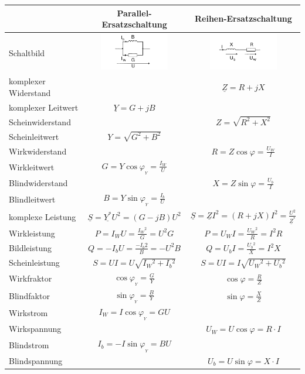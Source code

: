 	\begin{centering}
			
	\begin{tabular}{|l|c|c|}
		\hline
			& Parallel-Ersatzschaltung & Reihen-Ersatzschaltung \\
		\hline
			Schaltbild & \includegraphics[width=3cm]{./images/RL_parallel.png} &
			\includegraphics[width=3cm]{./images/RL_Seriel.png}\\
		\hline
			komplexer Widerstand & & $\underline{Z}=R+jX$\\
			komplexer Leitwert & $\underline{Y}=G+jB$ &\\
		\hline
			Scheinwiderstand & & $Z=\sqrt{R^2+X^2}$\\
			Scheinleitwert & $Y=\sqrt{G^2+B^2}$ & \\
		\hline
			Wirkwiderstand & & $R=Z\cos\varphi=\frac{U_W}{I}$\\
			Wirkleitwert & $G=Y\cos\varphi_{_Y}=\frac{I_W}{U}$&\\
		\hline
			Blindwiderstand & & $X=Z\sin\varphi=\frac{U_b}{I}$\\
			Blindleitwert & $B = Y\sin\varphi_{_Y} = \frac{I_b}{U}$&\\
		\hline
			komplexe Leistung & $\underline{S}=
			\underline{Y^*}U^2=\left(G-jB\right)U^2$& $\underline{S}=\underline{Z}I^2=\left(R+jX\right)I^2 = \frac{U^2}{\underline{Z}^{\ast}}$\\
			Wirkleistung & $P=I_W U=\frac{I{_W}{^2}}{G}=U^2G$ &
			$P=U_WI=\frac{U{_W}{^2}}{R}=I^2R$ \\
			Bildleistung & $Q=-I_bU=\frac{-I{_b}{2}}{B}=-U^2B$ & $Q = U_bI =
			\frac{U{_b}{^2}}{X}=I^2X$\\
			Scheinleistung & $S=UI=U\sqrt{I{_W}{^2}+I{_b}{^2}}$ & $S=UI =
			I\sqrt{U{_W}{^2}+U{_b}{^2}}$\\
		\hline
			Wirkfraktor & $\cos\varphi_{_Y}= \frac{G}{Y}$ & $\cos\varphi=\frac{R}{Z}$\\
			Blindfaktor & $\sin\varphi_{_Y}= \frac{B}{Y}$ & $\sin\varphi=\frac{X}{Z}$\\
		\hline
			Wirkstrom & $I_W=I\cos\varphi_{_Y}=GU$ & \\
			Wirkspannung & & $U_W = U\cos\varphi =R \cdot I$ \\
		\hline
			Blindstrom & $I_b = -I \sin\varphi_{_Y} = BU$ & \\
			Blindspannung & & $U_b=U\sin\varphi=X\cdot I$\\
		\hline
	\end{tabular}\\
	\end{centering}

